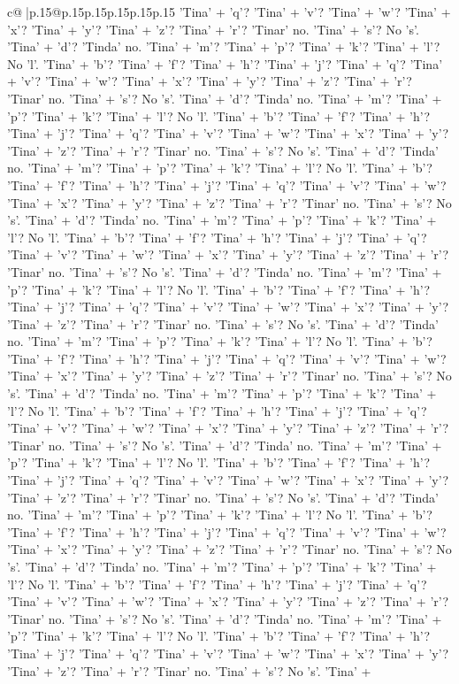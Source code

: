 \documentclass{article}
\begin{document}
{\begin{supertabular}{c@{$\;$}|p{.15\linewidth}@{}p{.15\linewidth}p{.15\linewidth}p{.15\linewidth}p{.15\linewidth}p{.15\linewidth}}
{{{'Tina' + 'q'? 'Tina' + 'v'? 'Tina' + 'w'? 'Tina' + 'x'? 'Tina' + 'y'? 'Tina' + 'z'? 'Tina' + 'r'? 'Tinar' no. 'Tina' + 's'? No 's'. 'Tina' + 'd'? 'Tinda' no. 'Tina' + 'm'? 'Tina' + 'p'? 'Tina' + 'k'? 'Tina' + 'l'? No 'l'. 'Tina' + 'b'? 'Tina' + 'f'? 'Tina' + 'h'? 'Tina' + 'j'? 'Tina' + 'q'? 'Tina' + 'v'? 'Tina' + 'w'? 'Tina' + 'x'? 'Tina' + 'y'? 'Tina' + 'z'? 'Tina' + 'r'? 'Tinar' no. 'Tina' + 's'? No 's'. 'Tina' + 'd'? 'Tinda' no. 'Tina' + 'm'? 'Tina' + 'p'? 'Tina' + 'k'? 'Tina' + 'l'? No 'l'. 'Tina' + 'b'? 'Tina' + 'f'? 'Tina' + 'h'? 'Tina' + 'j'? 'Tina' + 'q'? 'Tina' + 'v'? 'Tina' + 'w'? 'Tina' + 'x'? 'Tina' + 'y'? 'Tina' + 'z'? 'Tina' + 'r'? 'Tinar' no. 'Tina' + 's'? No 's'. 'Tina' + 'd'? 'Tinda' no. 'Tina' + 'm'? 'Tina' + 'p'? 'Tina' + 'k'? 'Tina' + 'l'? No 'l'. 'Tina' + 'b'? 'Tina' + 'f'? 'Tina' + 'h'? 'Tina' + 'j'? 'Tina' + 'q'? 'Tina' + 'v'? 'Tina' + 'w'? 'Tina' + 'x'? 'Tina' + 'y'? 'Tina' + 'z'? 'Tina' + 'r'? 'Tinar' no. 'Tina' + 's'? No 's'. 'Tina' + 'd'? 'Tinda' no. 'Tina' + 'm'? 'Tina' + 'p'? 'Tina' + 'k'? 'Tina' + 'l'? No 'l'. 'Tina' + 'b'? 'Tina' + 'f'? 'Tina' + 'h'? 'Tina' + 'j'? 'Tina' + 'q'? 'Tina' + 'v'? 'Tina' + 'w'? 'Tina' + 'x'? 'Tina' + 'y'? 'Tina' + 'z'? 'Tina' + 'r'? 'Tinar' no. 'Tina' + 's'? No 's'. 'Tina' + 'd'? 'Tinda' no. 'Tina' + 'm'? 'Tina' + 'p'? 'Tina' + 'k'? 'Tina' + 'l'? No 'l'. 'Tina' + 'b'? 'Tina' + 'f'? 'Tina' + 'h'? 'Tina' + 'j'? 'Tina' + 'q'? 'Tina' + 'v'? 'Tina' + 'w'? 'Tina' + 'x'? 'Tina' + 'y'? 'Tina' + 'z'? 'Tina' + 'r'? 'Tinar' no. 'Tina' + 's'? No 's'. 'Tina' + 'd'? 'Tinda' no. 'Tina' + 'm'? 'Tina' + 'p'? 'Tina' + 'k'? 'Tina' + 'l'? No 'l'. 'Tina' + 'b'? 'Tina' + 'f'? 'Tina' + 'h'? 'Tina' + 'j'? 'Tina' + 'q'? 'Tina' + 'v'? 'Tina' + 'w'? 'Tina' + 'x'? 'Tina' + 'y'? 'Tina' + 'z'? 'Tina' + 'r'? 'Tinar' no. 'Tina' + 's'? No 's'. 'Tina' + 'd'? 'Tinda' no. 'Tina' + 'm'? 'Tina' + 'p'? 'Tina' + 'k'? 'Tina' + 'l'? No 'l'. 'Tina' + 'b'? 'Tina' + 'f'? 'Tina' + 'h'? 'Tina' + 'j'? 'Tina' + 'q'? 'Tina' + 'v'? 'Tina' + 'w'? 'Tina' + 'x'? 'Tina' + 'y'? 'Tina' + 'z'? 'Tina' + 'r'? 'Tinar' no. 'Tina' + 's'? No 's'. 'Tina' + 'd'? 'Tinda' no. 'Tina' + 'm'? 'Tina' + 'p'? 'Tina' + 'k'? 'Tina' + 'l'? No 'l'. 'Tina' + 'b'? 'Tina' + 'f'? 'Tina' + 'h'? 'Tina' + 'j'? 'Tina' + 'q'? 'Tina' + 'v'? 'Tina' + 'w'? 'Tina' + 'x'? 'Tina' + 'y'? 'Tina' + 'z'? 'Tina' + 'r'? 'Tinar' no. 'Tina' + 's'? No 's'. 'Tina' + 'd'? 'Tinda' no. 'Tina' + 'm'? 'Tina' + 'p'? 'Tina' + 'k'? 'Tina' + 'l'? No 'l'. 'Tina' + 'b'? 'Tina' + 'f'? 'Tina' + 'h'? 'Tina' + 'j'? 'Tina' + 'q'? 'Tina' + 'v'? 'Tina' + 'w'? 'Tina' + 'x'? 'Tina' + 'y'? 'Tina' + 'z'? 'Tina' + 'r'? 'Tinar' no. 'Tina' + 's'? No 's'. 'Tina' + 'd'? 'Tinda' no. 'Tina' + 'm'? 'Tina' + 'p'? 'Tina' + 'k'? 'Tina' + 'l'? No 'l'. 'Tina' + 'b'? 'Tina' + 'f'? 'Tina' + 'h'? 'Tina' + 'j'? 'Tina' + 'q'? 'Tina' + 'v'? 'Tina' + 'w'? 'Tina' + 'x'? 'Tina' + 'y'? 'Tina' + 'z'? 'Tina' + 'r'? 'Tinar' no. 'Tina' + 's'? No 's'. 'Tina' + 'd'? 'Tinda' no. 'Tina' + 'm'? 'Tina' + 'p'? 'Tina' + 'k'? 'Tina' + 'l'? No 'l'. 'Tina' + 'b'? 'Tina' + 'f'? 'Tina' + 'h'? 'Tina' + 'j'? 'Tina' + 'q'? 'Tina' + 'v'? 'Tina' + 'w'? 'Tina' + 'x'? 'Tina' + 'y'? 'Tina' + 'z'? 'Tina' + 'r'? 'Tinar' no. 'Tina' + 's'? No 's'. 'Tina' + }}}
\end{supertabular}}
\end{document}
